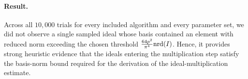 \paragraph{Result.}
Across all \(10{,}000\) trials for every included algorithm and every parameter set, we did not observe a single sampled ideal whose basis contained an element with reduced norm exceeding the chosen threshold $\frac{64p^2}{\pi^4}\mathrm{nrd}(I)$. Hence, it provides strong heuristic evidence that the ideals entering the multiplication step satisfy the basis-norm bound required for the derivation of the ideal-multiplication estimate.




